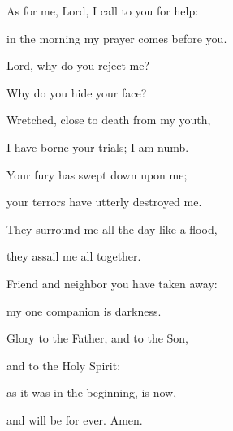 \noindent As for me, Lord, I call to you for help:~\GreStar{}~\nopagebreak

in the morning my prayer comes before you.

\noindent Lord, why do you reject me?~\GreStar{}~\nopagebreak

Why do you hide your face?

\noindent Wretched, close to death from my youth,~\GreStar{}~\nopagebreak

I have borne your trials; I am numb.

\noindent Your fury has swept down upon me;~\GreStar{}~\nopagebreak

your terrors have utterly destroyed me.

\noindent They surround me all the day like a flood,~\GreStar{}~\nopagebreak

they assail me all together.

\noindent Friend and neighbor you have taken away:~\GreStar{}~\nopagebreak

my one companion is darkness.

\noindent Glory to the Father, and to the Son,~\GreStar{}~\nopagebreak

and to the Holy Spirit:

\noindent as it was in the beginning, is now,~\GreStar{}~\nopagebreak

and will be for ever. Amen.

